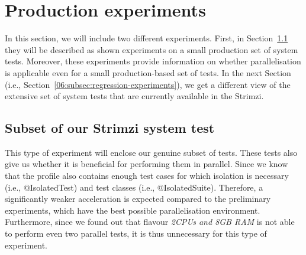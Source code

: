 
\section{Production experiments}

In this section, we will include two different experiments.
First, in Section~\ref{06:subsec:acceptance-experiments} they will be described as shown experiments on a small production set of system tests.
Moreover, these experiments provide information on whether parallelisation is applicable even for a small production-based set of tests.
In the next Section (i.e., Section~\ref{06:subsec:regression-experiments}), we get a different view of the extensive set
of system tests that are currently available in the Strimzi.

\subsection{Subset of our Strimzi system test}
\label{06:subsec:acceptance-experiments}

This type of experiment will enclose our genuine subset of tests.
These tests also give us whether it is beneficial for performing them in parallel.
Since we know that the profile also contains enough test cases for which isolation is necessary (i.e., @IsolatedTest) and test classes (i.e., @IsolatedSuite).
Therefore, a significantly weaker acceleration is expected compared to the preliminary experiments, which have the best possible parallelisation environment.
Furthermore, since we found out that flavour \emph{2CPUs and 8GB RAM} is not able to perform even two parallel tests, it is thus unnecessary for this type of experiment.

